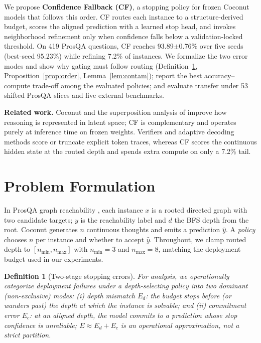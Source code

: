 \documentclass{article}
\theoremstyle{compactthm}
\theoremstyle{compactdef}
\newtheorem{definition}{Definition}
\begin{document}
We propose \textbf{Confidence Fallback (CF)}, a stopping policy for frozen Coconut models that follows this order. CF routes each instance to a structure-derived budget, scores the aligned prediction with a learned stop head, and invokes neighborhood refinement only when confidence falls below a validation-locked threshold. On 419 ProsQA questions, CF reaches 93.89$\pm$0.76\% over five seeds (best-seed 95.23\%) while refining 7.2\% of instances. We formalize the two error modes and show why gating must follow routing (Definition~\ref{def:errors}, Proposition~\ref{prop:order}, Lemma~\ref{lem:contam}); report the best accuracy--compute trade-off among the evaluated policies; and evaluate transfer under 53 shifted ProsQA slices and five external benchmarks.

\noindent\textbf{Related work.} Coconut \citep{hao2024coconut} and the superposition analysis of \citet{zhu2025superposition} improve how reasoning is represented in latent space; CF is complementary and operates purely at inference time on frozen weights. Verifiers and adaptive decoding methods \citep{cobbe2021training} score or truncate explicit token traces, whereas CF scores the continuous hidden state at the routed depth and spends extra compute on only a 7.2\% tail.

\section{Problem Formulation}
\label{sec:problem}
In ProsQA graph reachability \citep{hao2024coconut}, each instance $x$ is a rooted directed graph with two candidate targets; $y$ is the reachability label and $d$ the BFS depth from the root. Coconut generates $n$ continuous thoughts and emits a prediction $\hat y$. A \emph{policy} chooses $n$ per instance and whether to accept $\hat y$. Throughout, we clamp routed depth to $[n_{\min},n_{\max}]$ with $n_{\min}{=}3$ and $n_{\max}{=}8$, matching the deployment budget used in our experiments.

\begin{definition}[Two-stage stopping errors]
\label{def:errors}
For analysis, we operationally categorize deployment failures under a depth-selecting policy into two dominant (non-exclusive) modes: (i) \emph{depth mismatch} $E_d$: the budget stops before (or wanders past) the depth at which the instance is solvable; and (ii) \emph{commitment error} $E_c$: at an aligned depth, the model commits to a prediction whose stop confidence is unreliable; $E \approx E_d + E_c$ is an operational approximation, not a strict partition.
\end{definition}
\end{document}
